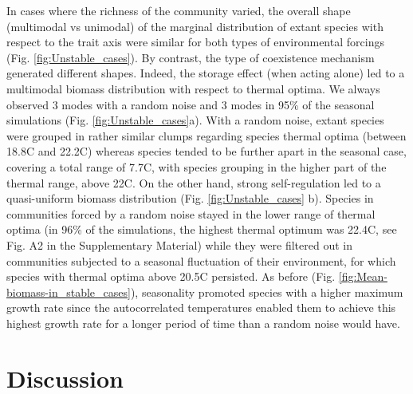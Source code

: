 \documentclass[a4paper,12pt]{article}
\begin{document}
In cases where the richness of the community varied, the overall shape
(multimodal vs unimodal) of the marginal distribution of extant species
with respect to the trait axis were similar for both types of environmental
forcings (Fig. \ref{fig:Unstable_cases}). By contrast, the type of
coexistence mechanism generated different shapes. Indeed, the storage
effect (when acting alone) led to a multimodal biomass distribution
with respect to thermal optima. We always observed 3 modes with a
random noise and 3 modes in 95\% of the seasonal simulations (Fig.
\ref{fig:Unstable_cases}a). With a random noise, extant species were
grouped in rather similar clumps regarding species thermal optima
(between 18.8\textdegree C and 22.2\textdegree C) whereas species tended to be further apart
in the seasonal case, covering a total range of 7.7\textdegree C, with species
grouping in the higher part of the thermal range, above 22\textdegree C. On the
other hand, strong self-regulation led to a quasi-uniform biomass
distribution (Fig. \ref{fig:Unstable_cases} b). Species in communities
forced by a random noise stayed in the lower range of thermal optima
(in 96\% of the simulations, the highest thermal optimum was 22.4\textdegree C,
see Fig. A2 in the Supplementary Material) while they were filtered
out in communities subjected to a seasonal fluctuation of their environment,
for which species with thermal optima above 20.5\textdegree C persisted. As before
(Fig. \ref{fig:Mean-biomass-in_stable_cases}), seasonality promoted
species with a higher maximum growth rate since the autocorrelated
temperatures enabled them to achieve this highest growth rate for
a longer period of time than a random noise would have. 

\section*{Discussion}
\end{document}
